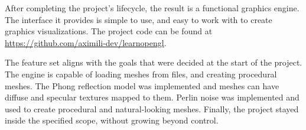 
After completing the project's lifecycle,
the result is a functional graphics engine.
The interface it provides is simple to use,
and easy to work with to create graphics visualizations.
The project code can be found at \url{https://github.com/aximili-dev/learnopengl}.

The feature set aligns with the goals that were decided at the start of the project.
The engine is capable of loading meshes from files,
and creating procedural meshes.
The Phong reflection model was implemented and meshes can have diffuse and specular textures mapped to them.
Perlin noise was implemented and used to create procedural and natural-looking meshes.
Finally,
the project stayed inside the specified scope,
without growing beyond control.
